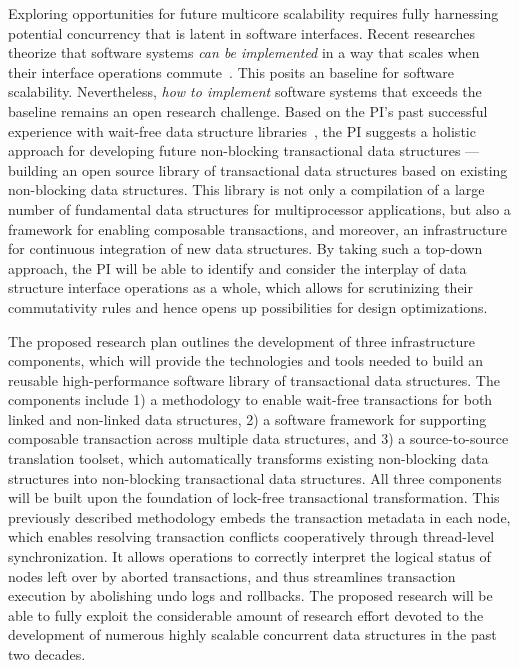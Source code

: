 \documentclass{article}
\begin{document}
Exploring opportunities for future multicore scalability requires fully harnessing potential concurrency that is latent in software interfaces.
Recent researches theorize that software systems \emph{can be implemented} in a way that scales when their interface operations commute~\cite{clements2015scalable,herlihy2008transactional}.
This posits an baseline for software scalability. 
Nevertheless, \emph{how to implement} software systems that exceeds the baseline remains an open research challenge.
Based on the PI's past successful experience with wait-free data structure libraries~\cite{feldman2015tervel}, the PI suggests a holistic approach for developing future non-blocking transactional data structures --- building an open source library of transactional data structures based on existing non-blocking data structures.
This library is not only a compilation of a large number of fundamental data structures for multiprocessor applications, but also a framework for enabling composable transactions, and moreover, an infrastructure for continuous integration of new data structures.  
By taking such a top-down approach, the PI will be able to identify and consider the interplay of data structure interface operations as a whole, which allows for scrutinizing their commutativity rules and hence opens up possibilities for design optimizations.


The proposed research plan outlines the development of three infrastructure components, which will provide the technologies and tools needed to build an reusable high-performance software library of transactional data structures.
The components include 1) a methodology to enable wait-free transactions for both linked and non-linked data structures, 2) a software framework for supporting composable transaction across multiple data structures, and 3) a source-to-source translation toolset, which automatically transforms existing non-blocking data structures into non-blocking transactional data structures.
All three components will be built upon the foundation of lock-free transactional transformation. 
This previously described methodology embeds the transaction metadata in each node, which enables resolving transaction conflicts cooperatively through thread-level synchronization.
It allows operations to correctly interpret the logical status of nodes left over by aborted transactions, and thus streamlines transaction execution by abolishing undo logs and rollbacks.
The proposed research will be able to fully exploit the considerable amount of research effort devoted to the development of numerous highly scalable concurrent data structures in the past two decades.
\end{document}

